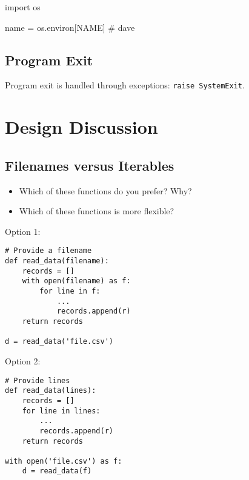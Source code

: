 \documentclass[
  letterpaper,
  DIV=11,
  numbers=noendperiod]{scrreprt}
\newenvironment{Shaded}{\begin{snugshade}}{\end{snugshade}}
\newcommand{\CommentTok}[1]{\textcolor[rgb]{0.37,0.37,0.37}{#1}}
\newcommand{\ImportTok}[1]{\textcolor[rgb]{0.00,0.46,0.62}{#1}}
\newcommand{\NormalTok}[1]{\textcolor[rgb]{0.00,0.46,0.62}{#1}}
\newcommand{\OperatorTok}[1]{\textcolor[rgb]{0.37,0.37,0.37}{#1}}
\newcommand{\StringTok}[1]{\textcolor[rgb]{0.13,0.47,0.30}{#1}}
\providecommand{\tightlist}{%
  \setlength{\itemsep}{0pt}\setlength{\parskip}{0pt}}
\begin{document}
\begin{Shaded}
\begin{Highlighting}[]
\ImportTok{import}\NormalTok{ os}

\NormalTok{name }\OperatorTok{=}\NormalTok{ os.environ[}\StringTok{\textquotesingle{}NAME\textquotesingle{}}\NormalTok{] }\CommentTok{\# \textquotesingle{}dave\textquotesingle{}}
\end{Highlighting}
\end{Shaded}

\hypertarget{program-exit}{%
\subsection{Program Exit}\label{program-exit}}

Program exit is handled through exceptions: \texttt{raise\ SystemExit}.

\hypertarget{design-discussion}{%
\section{Design Discussion}\label{design-discussion}}

\hypertarget{filenames-versus-iterables}{%
\subsection{Filenames versus
Iterables}\label{filenames-versus-iterables}}

\begin{itemize}
\tightlist
\item
  Which of these functions do you prefer? Why?
\item
  Which of these functions is more flexible?
\end{itemize}

Option 1:

\begin{verbatim}
# Provide a filename
def read_data(filename):
    records = []
    with open(filename) as f:
        for line in f:
            ...
            records.append(r)
    return records

d = read_data('file.csv')
\end{verbatim}

Option 2:

\begin{verbatim}
# Provide lines
def read_data(lines):
    records = []
    for line in lines:
        ...
        records.append(r)
    return records

with open('file.csv') as f:
    d = read_data(f)
\end{verbatim}
\end{document}

